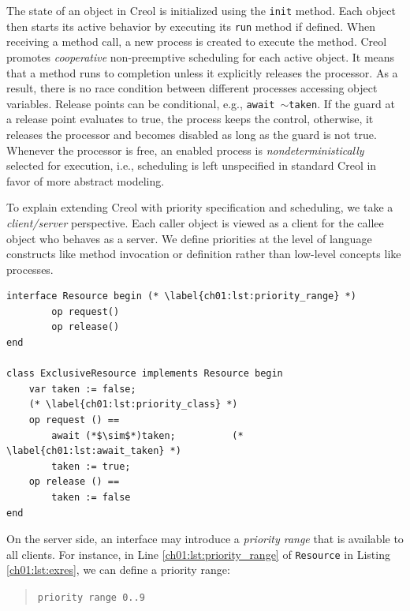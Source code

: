 The state of an object in Creol is initialized using the \lstinline{init} method.
Each object then starts its active behavior by executing its
\lstinline{run} method if defined. %
When receiving a method call, a new process is created to execute the method. 
Creol promotes {\em cooperative} non-preemptive scheduling for each active object. 
It means that a method runs to completion unless it explicitly releases the processor. 
As a result, there is no race condition between different processes accessing object variables. 
Release points can be conditional, e.g.,   \lstinline{await }$\sim$\lstinline{taken}. 
If the guard at a release point evaluates to true, the
process keeps the control, otherwise, it releases the processor and becomes
disabled as long as the guard is not true. Whenever the processor is free, an
enabled process is {\em nondeterministically} selected for execution, i.e.,
scheduling is left unspecified in standard Creol in favor of more abstract modeling.

To explain extending Creol with priority specification and scheduling, we take a {\em client/server} perspective.
Each {caller} object is viewed as a client for the {callee} object who behaves as a server. 
We define priorities at the level of language constructs like method invocation or definition rather than low-level concepts like processes.

\begin{lstlisting}[float=t, label=ch01:lst:exres, caption=Exclusive Resource in Creol]
interface Resource begin (* \label{ch01:lst:priority_range} *)
		op request()
		op release()
end

class ExclusiveResource implements Resource begin
	var taken := false;
	(* \label{ch01:lst:priority_class} *)
	op request () == 
		await (*$\sim$*)taken; 			(* \label{ch01:lst:await_taken} *)
		taken := true;
	op release () ==
		taken := false
end
\end{lstlisting}


On the server side, an interface may introduce a \textit{priority
range} that is available to all clients. For instance, in Line
\ref{ch01:lst:priority_range} of {\footnotesize\texttt{Resource}} in Listing
\ref{ch01:lst:exres}, we can define a priority range: 

\begin{quote}
\lstinline{priority range 0..9}
\end{quote}

